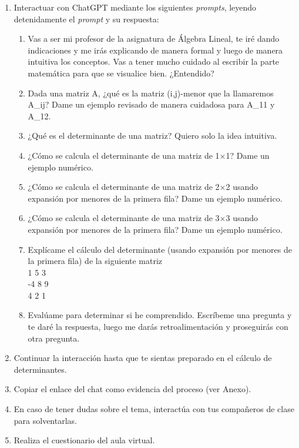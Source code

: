 \documentclass[a4,11pt]{aleph-notas}
\begin{document}
\begin{enumerate}[leftmargin=*]
    \item Interactuar con ChatGPT mediante los siguientes \textit{prompts}, leyendo detenidamente el \textit{prompt} y su respuesta:
    \begin{enumerate}[label=\textit{Prompt \arabic*.},leftmargin=2.1cm]
        \item Vas a ser mi profesor de la asignatura de Álgebra Lineal, te iré dando indicaciones y me irás explicando de manera formal y luego de manera intuitiva los conceptos. Vas a tener mucho cuidado al escribir la parte matemática para que se visualice bien. ¿Entendido?
        \item Dada una matriz A, ¿qué es la matriz (i,j)-menor que la llamaremos A\_ij? Dame un ejemplo revisado de manera cuidadosa para A\_11 y A\_12.
        \item ¿Qué es el determinante de una matriz? Quiero solo la idea intuitiva.
        \item ¿Cómo se calcula el determinante de una matriz de 1$\times$1? Dame un ejemplo numérico.
        \item ¿Cómo se calcula el determinante de una matriz de 2$\times$2 usando expansión por menores de la primera fila? Dame un ejemplo numérico.
        \item ¿Cómo se calcula el determinante de una matriz de 3$\times$3 usando expansión por menores de la primera fila? Dame un ejemplo numérico.
        \item Explícame el cálculo del determinante (usando expansión por menores de la primera fila) de la siguiente matriz\\
        1 5 3\\
        -4 8 9\\
        4 2 1
        \item Evalúame para determinar si he comprendido. Escríbeme una pregunta y te daré la respuesta, luego me darás retroalimentación y proseguirás con otra pregunta.
    \end{enumerate}
    \item Continuar la interacción hasta que te sientas preparado en el cálculo de determinantes.
    \item Copiar el enlace del chat como evidencia del proceso (ver Anexo).
    \item En caso de tener dudas sobre el tema, interactúa con tus compañeros de clase para solventarlas.
    \item Realiza el cuestionario del aula virtual.
\end{enumerate}
\end{document}
